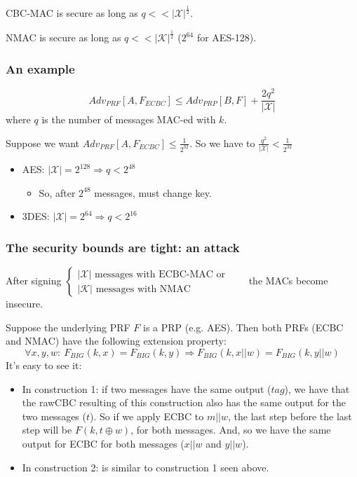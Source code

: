 \documentclass[12pt]{book}
\begin{document}
CBC-MAC is secure as long as $q<<|\mathcal{X}|^{\frac{1}{2}}$.

NMAC is secure as long as $q<<|\mathcal{K}|^{\frac{1}{2}}$ ($2^{64}$ for AES-128).

\subsubsection{An example}
$$Adv_{PRF}[A,F_{ECBC}]\leq Adv_{PRP}[B,F]+\frac{2q^{2}}{|\mathcal{X}|}$$where $q$ is the number of messages MAC-ed with $k$.

Suppose we want $Adv_{PRF}[A,F_{ECBC}]\leq\frac{1}{2^{32}}$. So we have to $\frac{q^{2}}{|\mathcal{X}|}<\frac{1}{2^{32}}$
\begin{itemize}
	\item AES: $|\mathcal{X}|=2^{128}\Rightarrow q<2^{48}$
	\begin{itemize}
		\item So, after $2^{48}$ messages, must change key.
	\end{itemize}
	\item 3DES: $|\mathcal{X}|=2^{64}\Rightarrow q<2^{16}$
\end{itemize}

\subsubsection{The security bounds are tight: an attack}
After signing $\left\{\begin{array}{ll}
	|\mathcal{X}|\text{ messages with ECBC-MAC or}\\
	|\mathcal{K}|\text{ messages with NMAC}
\end{array}\right.$\ \ \ \ the MACs become insecure.

Suppose the underlying PRF $F$ is a PRP (e.g. AES). Then both PRFs (ECBC and NMAC) have the following extension property:
$$\forall x,y,w:\ F_{BIG}(k,x)=F_{BIG}(k,y)\Rightarrow F_{BIG}(k,x||w)=F_{BIG}(k,y||w)$$
It's easy to see it:
\begin{itemize}
	\item In construction 1: if two messages have the same output ($tag$), we have that the rawCBC resulting of this construction also has the same output for the two messages ($t$). So if we apply ECBC to $m||w$, the last step before the last step will be $F(k,t\oplus w)$, for both messages. And, so we have the same output for ECBC for both messages ($x||w$ and $y||w$).
	\item In construction 2: is similar to construction 1 seen above.
\end{itemize}
\end{document}

